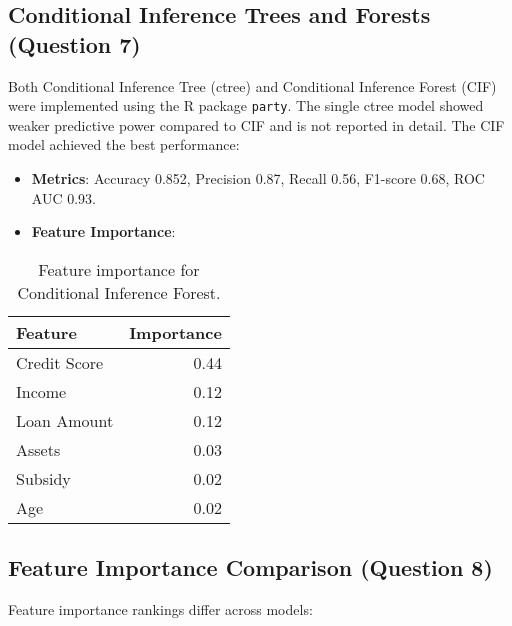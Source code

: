 \documentclass[a4paper,12pt,headsepline]{scrartcl} %
\begin{document}
\subsection{Conditional Inference Trees and Forests (Question 7)}
Both Conditional Inference Tree (ctree) and Conditional Inference Forest (CIF) were implemented using the R package \texttt{party}. The single ctree model showed weaker predictive power compared to CIF and is not reported in detail. The CIF model achieved the best performance:
\begin{itemize}
    \item \textbf{Metrics}: Accuracy 0.852, Precision 0.87, Recall 0.56, F1-score 0.68, ROC AUC 0.93.
    \item \textbf{Feature Importance}:
\end{itemize}

\begin{table}[h]
\centering
\begin{tabular}{lr}
\toprule
Feature & Importance \\
\midrule
Credit Score & 0.44 \\
Income & 0.12 \\
Loan Amount & 0.12 \\
Assets & 0.03 \\
Subsidy & 0.02 \\
Age & 0.02 \\
\bottomrule
\end{tabular}
\caption{Feature importance for Conditional Inference Forest.}
\label{tab:cif_importance}
\end{table}

\subsection{Feature Importance Comparison (Question 8)}
Feature importance rankings differ across models:

\begin{table}[h]
\centering
\small
{}
\caption{Feature importance comparison across models.}
\label{tab:feature_importance}
\end{table}
\end{document}
